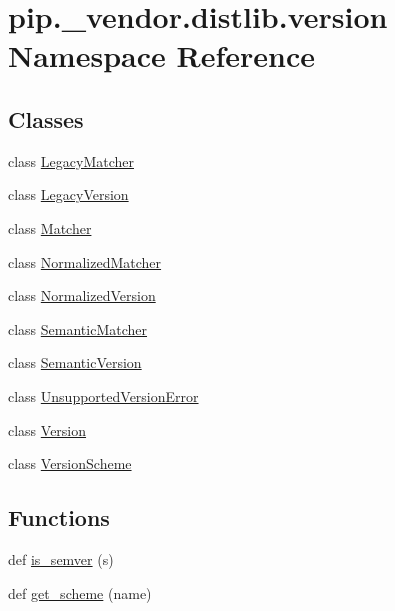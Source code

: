 \hypertarget{namespacepip_1_1__vendor_1_1distlib_1_1version}{}\section{pip.\+\_\+vendor.\+distlib.\+version Namespace Reference}
\label{namespacepip_1_1__vendor_1_1distlib_1_1version}
\subsection*{Classes}
\begin{DoxyCompactItemize}
\item 
class \hyperlink{classpip_1_1__vendor_1_1distlib_1_1version_1_1LegacyMatcher}{Legacy\+Matcher}
\item 
class \hyperlink{classpip_1_1__vendor_1_1distlib_1_1version_1_1LegacyVersion}{Legacy\+Version}
\item 
class \hyperlink{classpip_1_1__vendor_1_1distlib_1_1version_1_1Matcher}{Matcher}
\item 
class \hyperlink{classpip_1_1__vendor_1_1distlib_1_1version_1_1NormalizedMatcher}{Normalized\+Matcher}
\item 
class \hyperlink{classpip_1_1__vendor_1_1distlib_1_1version_1_1NormalizedVersion}{Normalized\+Version}
\item 
class \hyperlink{classpip_1_1__vendor_1_1distlib_1_1version_1_1SemanticMatcher}{Semantic\+Matcher}
\item 
class \hyperlink{classpip_1_1__vendor_1_1distlib_1_1version_1_1SemanticVersion}{Semantic\+Version}
\item 
class \hyperlink{classpip_1_1__vendor_1_1distlib_1_1version_1_1UnsupportedVersionError}{Unsupported\+Version\+Error}
\item 
class \hyperlink{classpip_1_1__vendor_1_1distlib_1_1version_1_1Version}{Version}
\item 
class \hyperlink{classpip_1_1__vendor_1_1distlib_1_1version_1_1VersionScheme}{Version\+Scheme}
\end{DoxyCompactItemize}
\subsection*{Functions}
\begin{DoxyCompactItemize}
\item 
def \hyperlink{namespacepip_1_1__vendor_1_1distlib_1_1version_aae02bee910114ff6025b123ae81d238a}{is\+\_\+semver} (s)
\item 
def \hyperlink{namespacepip_1_1__vendor_1_1distlib_1_1version_a8c5d1e29de28da68e909b035170e2251}{get\+\_\+scheme} (name)
\end{DoxyCompactItemize}
